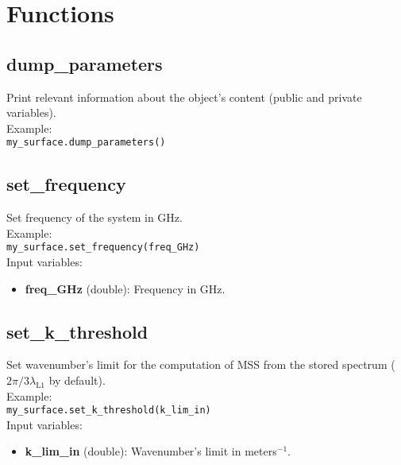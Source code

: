 \section{Functions}

\subsection{dump\_parameters}

Print relevant information about the object's content (public and private variables).\\

Example:\\

\texttt{my\_surface.dump\_parameters()}\\


\subsection{set\_frequency}

Set frequency of the system in GHz.\\

Example:\\

\texttt{my\_surface.set\_frequency(freq\_GHz)}\\

Input variables:
\begin{itemize}
\item {\bf freq\_GHz} (double): Frequency in GHz.
\end{itemize}


\subsection{set\_k\_threshold}

Set wavenumber's limit for the computation of MSS from the stored spectrum ($2\pi/3\lambda_\mathrm{L1}$ by default).\\

Example:\\

\texttt{my\_surface.set\_k\_threshold(k\_lim\_in)}\\

Input variables:
\begin{itemize}
\item {\bf k\_lim\_in} (double): Wavenumber's limit in meters$^{-1}$.
\end{itemize}


